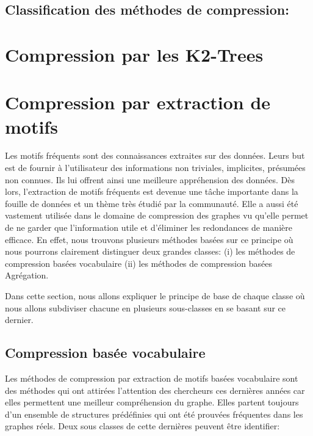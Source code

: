 \documentclass[a4paper,oneside,12pt]{report}
\theoremstyle{definition}
\begin{document}
			\subsection{Classification des méthodes de compression:}
				
				
			\section{Compression par les K2-Trees}
				
				
			\section{Compression par extraction de motifs}
			 Les motifs fréquents sont des connaissances extraites sur des données. Leurs but est de fournir à l'utilisateur des informations non triviales, implicites, présumées non connues. Ils lui offrent ainsi une meilleure appréhension des données. Dès lors, l'extraction de motifs fréquents est  devenue une tâche importante dans la fouille de données et un thème très étudié par la communauté. Elle a aussi été vastement%
			 utilisée dans le domaine de compression des graphes vu qu'elle permet de ne garder que l'information utile et d'éliminer les redondances de manière efficace. En effet, nous trouvons plusieurs méthodes basées sur ce principe où nous pourrons clairement distinguer deux grandes classes: 
			 (i) les méthodes  de compression basées vocabulaire
			 (ii) les méthodes  de compression basées Agrégation.
			 
				Dans cette section, nous allons expliquer le principe de base de chaque classe où nous allons subdiviser chacune  en plusieurs sous-classes en se basant sur ce dernier. 
			 
				\subsection{Compression basée vocabulaire}
				Les méthodes de compression par extraction de motifs basées vocabulaire sont des méthodes qui ont attirées l'attention des chercheurs ces dernières années car elles permettent une meilleur compréhension du graphe. Elles partent toujours d'un ensemble de structures prédéfinies qui ont été prouvées fréquentes dans les graphes réels. Deux sous classes de cette dernières peuvent être identifier:
				 
\end{document}
